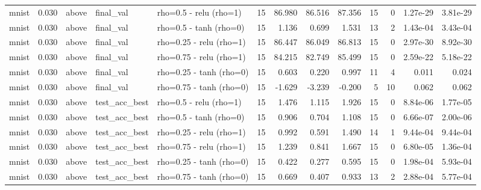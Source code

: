 \begin{table}[htbp]
{\begin{tabular}{@{}lrlllrrrrrrrr@{}}
mnist & 0.030 & above & final\_val & rho=0.5 - relu (rho=1) & 15 & 86.980 & 86.516 & 87.356 & 15 & 0 & 1.27e-29 & 3.81e-29 \\
mnist & 0.030 & above & final\_val & rho=0.5 - tanh (rho=0) & 15 & 1.136 & 0.699 & 1.531 & 13 & 2 & 1.43e-04 & 3.43e-04 \\
mnist & 0.030 & above & final\_val & rho=0.25 - relu (rho=1) & 15 & 86.447 & 86.049 & 86.813 & 15 & 0 & 2.97e-30 & 8.92e-30 \\
mnist & 0.030 & above & final\_val & rho=0.75 - relu (rho=1) & 15 & 84.215 & 82.749 & 85.499 & 15 & 0 & 2.59e-22 & 5.18e-22 \\
mnist & 0.030 & above & final\_val & rho=0.25 - tanh (rho=0) & 15 & 0.603 & 0.220 & 0.997 & 11 & 4 & 0.011 & 0.024 \\
mnist & 0.030 & above & final\_val & rho=0.75 - tanh (rho=0) & 15 & -1.629 & -3.239 & -0.200 & 5 & 10 & 0.062 & 0.062 \\
mnist & 0.030 & above & test\_acc\_best & rho=0.5 - relu (rho=1) & 15 & 1.476 & 1.115 & 1.926 & 15 & 0 & 8.84e-06 & 1.77e-05 \\
mnist & 0.030 & above & test\_acc\_best & rho=0.5 - tanh (rho=0) & 15 & 0.906 & 0.704 & 1.108 & 15 & 0 & 6.66e-07 & 2.00e-06 \\
mnist & 0.030 & above & test\_acc\_best & rho=0.25 - relu (rho=1) & 15 & 0.992 & 0.591 & 1.490 & 14 & 1 & 9.44e-04 & 9.44e-04 \\
mnist & 0.030 & above & test\_acc\_best & rho=0.75 - relu (rho=1) & 15 & 1.239 & 0.841 & 1.667 & 15 & 0 & 6.80e-05 & 1.36e-04 \\
mnist & 0.030 & above & test\_acc\_best & rho=0.25 - tanh (rho=0) & 15 & 0.422 & 0.277 & 0.595 & 15 & 0 & 1.98e-04 & 5.93e-04 \\
mnist & 0.030 & above & test\_acc\_best & rho=0.75 - tanh (rho=0) & 15 & 0.669 & 0.407 & 0.933 & 13 & 2 & 2.88e-04 & 5.77e-04 \\
\bottomrule
\end{tabular}}
\end{table}
